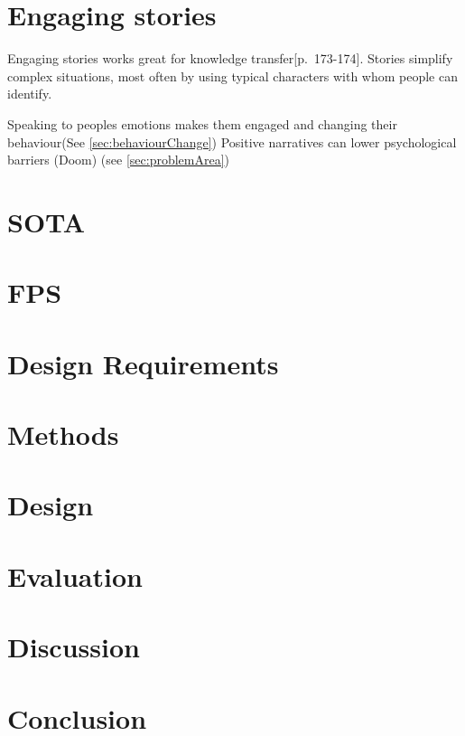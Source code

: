 \section{Engaging stories}
    Engaging stories works great for knowledge transfer\citep{engagingStoryFundamentals}[p.~173-174].
    Stories simplify complex situations, most often by using typical characters with whom people can identify\cite{engagingStoryFundamentals}.

    Speaking to peoples emotions makes them engaged and changing their behaviour\cite{vrEngagementClimateChange}(See \autoref{sec:behaviourChange})
    Positive narratives can lower psychological barriers (Doom) (see \autoref{sec:problemArea})

\section{SOTA}

\section{FPS}

\section{Design Requirements}

\section{Methods}

\section{Design}

\section{Evaluation}

\section{Discussion}

\section{Conclusion}





